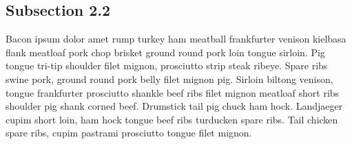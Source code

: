 \documentclass[12pt]{memoir}
\begin{document}
	\subsection{Subsection 2.2}
	Bacon ipsum dolor amet rump turkey ham meatball frankfurter venison kielbasa flank meatloaf pork chop brisket ground round pork loin tongue sirloin. Pig tongue tri-tip shoulder filet mignon, prosciutto strip steak ribeye. Spare ribs swine pork, ground round pork belly filet mignon pig. Sirloin biltong venison, tongue frankfurter prosciutto shankle beef ribs filet mignon meatloaf short ribs shoulder pig shank corned beef. Drumstick tail pig chuck ham hock. Landjaeger cupim short loin, ham hock tongue beef ribs turducken spare ribs. Tail chicken spare ribs, cupim pastrami prosciutto tongue filet mignon.
	
\end{document}
